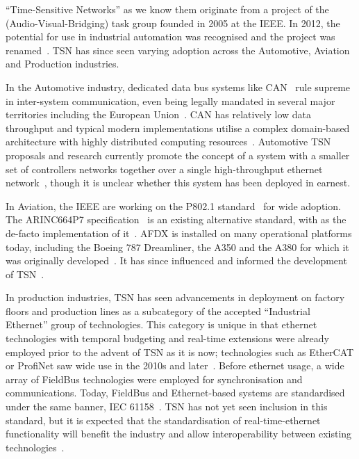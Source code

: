 ``Time-Sensitive Networks'' as we know them originate from a project of the  (Audio-Visual-Bridging) task group founded in 2005 at the IEEE.
In 2012, the potential for use in industrial automation was recognised and the project was renamed~\cite{imtiazProposalIntegrateProcess2011,zezulkaTimeSensitiveNetworkingCommunication2019}.
TSN has since seen varying adoption across the Automotive, Aviation and Production industries.

In the Automotive industry, dedicated data bus systems like CAN~\cite{RoadVehiclesController2024} rule supreme in inter-system communication, even being legally mandated in several major territories including the European Union~\cite{RegulationECNo2007}.
CAN has relatively low data throughput and typical modern implementations utilise a complex domain-based architecture with highly distributed computing resources~\cite{ashjaeiTimeSensitiveNetworkingAutomotive2021a}.
Automotive TSN proposals and research currently promote the concept of a system with a smaller set of controllers networks together over a single high-throughput ethernet network~\cite{ashjaeiTimeSensitiveNetworkingAutomotive2021a}, though it is unclear whether this system has been deployed in earnest.

In Aviation, the IEEE are working on the P802.1 standard~\cite{P8021DPTSN2024} for wide adoption.
The ARINC664P7 specification~\cite{ARINC664P71AIRCRAFTDATA2009} is an existing alternative standard, with  as the de-facto implementation of it~\cite{moreauxDataTransmissionSystem2005}.
AFDX is installed on many operational platforms today, including the Boeing 787 Dreamliner, the A350 and the A380 for which it was originally developed~\cite{AFDXTechnologyImprove2005,AirbusRockwellCollins13,itierA380IntegratedModular}.
It has since influenced and informed the development of TSN~\cite{pasquierAvionicsFullDuplex2015}.

In production industries, TSN has seen advancements in deployment on factory floors and production lines as a subcategory of the accepted ``Industrial Ethernet'' group of technologies.
This category is unique in that ethernet technologies with temporal budgeting and real-time extensions were already employed prior to the advent of TSN as it is now; technologies such as EtherCAT or ProfiNet saw wide use in the 2010s and later~\cite{linLookIndustrialEthernet2018}.
Before ethernet usage, a wide array of FieldBus technologies were employed for synchronisation and communications.
Today, FieldBus and Ethernet-based systems are standardised under the same banner, IEC 61158~\cite{IEC611581Industrial2023}.
TSN has not yet seen inclusion in this standard, but it is expected that the standardisation of real-time-ethernet functionality will benefit the industry and allow interoperability between existing technologies~\cite{linLookIndustrialEthernet2018,sommerEthernetSurveyIts2010}.

